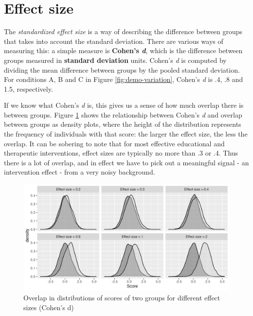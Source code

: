 \documentclass{krantz}
\begin{document}
\hypertarget{effect-size}{%
\section{Effect size}\label{effect-size}}

The \emph{standardized effect size}  is a way of describing the difference between groups that takes into account the standard deviation. There are various ways of measuring this: a simple measure is \textbf{Cohen's \emph{d}}, which is the difference between groups measured in \textbf{standard deviation} units. Cohen's \emph{d} is computed by dividing the mean difference between groups by the pooled standard deviation. For conditions A, B and C in Figure \ref{fig:demo-variation}, Cohen's \emph{d} is .4, .8 and 1.5, respectively.

If we know what Cohen's \emph{d} is, this gives us a sense of how much overlap there is between groups. Figure \ref{fig:effsizefig} shows the relationship between Cohen's \emph{d} and overlap between groups as density plots, where the height of the distribution represents the frequency of individuals with that score: the larger the effect size, the less the overlap. It can be sobering to note that for most effective educational and therapeutic interventions, effect sizes are typically no more than .3 or .4. Thus there is a lot of overlap, and in effect we have to pick out a meaningful signal - an intervention effect - from a very noisy background.

\begin{figure}
\includegraphics[width=1\linewidth]{images_bw/densityplot} \caption{Overlap in distributions of scores of two groups for different effect sizes (Cohen's d)}\label{fig:effsizefig}
\end{figure}
\end{document}
